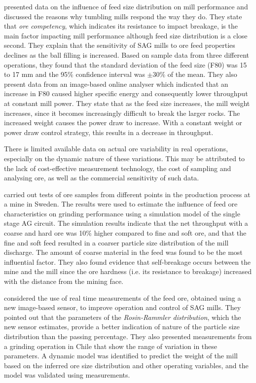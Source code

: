 \cite{morrell_influence_2001} presented data on the influence of feed size distribution on mill performance and discussed the reasons why tumbling mills respond the way they do. They state that \textit{ore competency}, which indicates its resistance to impact breakage, is the main factor impacting mill performance although feed size distribution is a close second. They explain that the sensitivity of \acrshort{SAG} mills to ore feed properties declines as the ball filling is increased. Based on sample data from three different operations, they found that the standard deviation of the feed size (F80) was 15 to 17 mm and the 95\% confidence interval was $\pm30\text{\%}$ of the mean. They also present data from an image-based online analyser which indicated that an increase in F80 caused higher specific energy and consequently lower throughput at constant mill power. They state that as the feed size increases, the mill weight increases, since it becomes increasingly difficult to break the larger rocks. The increased weight causes the power draw to increase. With a constant weight or power draw control strategy, this results in a decrease in throughput.

There is limited available data on actual ore variability in real operations, especially on the dynamic nature of these variations. This may be attributed to the lack of cost-effective measurement technology, the cost of sampling and analysing ore, as well as the commercial sensitivity of such data.

\cite{hahne_ore_2003} carried out tests of ore samples from different points in the production process at a mine in Sweden. The results were used to estimate the influence of feed ore characteristics on grinding performance using a simulation model of the single stage \gls{AG} circuit. The simulation results indicate that the net throughput with a coarse and hard ore was 10\% higher compared to fine and soft ore, and that the fine and soft feed resulted in a coarser particle size distribution of the mill discharge. The amount of coarse material in the feed was found to be the most influential factor. They also found evidence that self-breakage occurs between the mine and the mill since the ore hardness (i.e. its resistance to breakage) increased with the distance from the mining face.

\cite{nunez_characterization_2011} considered the use of real time measurements of the feed ore, obtained using a new image-based sensor, to improve operation and control of \acrshort{SAG} mills. They pointed out that the parameters of the \textit{Rosin-Rammler distribution}, which the new sensor estimates, provide a better indication of nature of the particle size distribution than the passing percentage. They also presented measurements from a grinding operation in Chile that show the range of variation in these parameters. A dynamic model was identified to predict the weight of the mill based on the inferred ore size distribution and other operating variables, and the model was validated using measurements.

